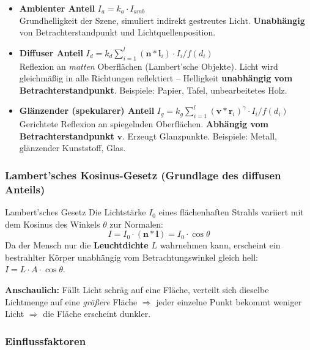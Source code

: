 \documentclass[12pt, a4paper]{article}
\begin{document}
\begin{itemize}
  \item \textbf{Ambienter Anteil} $I_a = k_a \cdot I_{amb}$\\
    Grundhelligkeit der Szene, simuliert indirekt gestreutes Licht.
    \textbf{Unabhängig} von Betrachterstandpunkt und Lichtquellenposition.

  \item \textbf{Diffuser Anteil} $I_d = k_d \displaystyle\sum_{i=1}^{l} (\mathbf{n} \ast \mathbf{l}_i) \cdot I_i/f(d_i)$\\
    Reflexion an \textit{matten} Oberflächen (Lambert'sche Objekte). Licht wird gleichmäßig in alle Richtungen reflektiert -- Helligkeit \textbf{unabhängig vom Betrachterstandpunkt}. Beispiele: Papier, Tafel, unbearbeitetes Holz.

  \item \textbf{Glänzender (spekularer) Anteil} $I_g = k_g \displaystyle\sum_{i=1}^{l} (\mathbf{v} \ast \mathbf{r}_i)^{\gamma} \cdot I_i/f(d_i)$\\
    Gerichtete Reflexion an spiegelnden Oberflächen. \textbf{Abhängig vom Betrachterstandpunkt} $\mathbf{v}$. Erzeugt Glanzpunkte. Beispiele: Metall, glänzender Kunststoff, Glas.
\end{itemize}

\subsubsection*{Lambert'sches Kosinus-Gesetz (Grundlage des diffusen Anteils)}

\begin{notebox}{Lambert'sches Gesetz}
Die Lichtstärke $I_0$ eines flächenhaften Strahls variiert mit dem Kosinus des Winkels $\theta$ zur Normalen:
\[
  I = I_0 \cdot (\mathbf{n} \ast \mathbf{l}) = I_0 \cdot \cos\theta
\]
Da der Mensch nur die \textbf{Leuchtdichte} $L$ wahrnehmen kann, erscheint ein bestrahlter Körper unabhängig vom Betrachtungswinkel gleich hell: $I = L \cdot A \cdot \cos\theta$.

\textbf{Anschaulich:} Fällt Licht schräg auf eine Fläche, verteilt sich dieselbe Lichtmenge auf eine \textit{größere} Fläche $\Rightarrow$ jeder einzelne Punkt bekommt weniger Licht $\Rightarrow$ die Fläche erscheint dunkler.
\end{notebox}

\subsubsection*{Einflussfaktoren}
\end{document}
